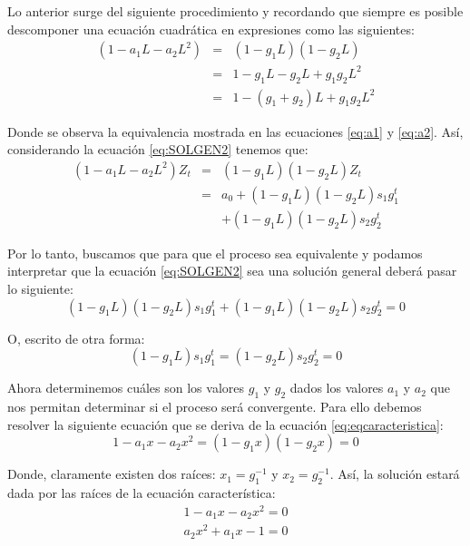 \documentclass[
]{book}
\begin{document}
Lo anterior surge del siguiente procedimiento y recordando que siempre es posible descomponer una ecuación cuadrática en expresiones como las siguientes:
\begin{eqnarray}
    (1 - a_1 L - a_2 L^2) & = & (1 - g_1 L)(1 - g_2 L) \nonumber \\
    & = & 1 - g_1 L - g_2 L + g_1 g_2 L^2 \nonumber \\
    & = & 1 - (g_1 + g_2) L + g_1 g_2 L^2
    \label{eq:eqcaracteristica}
\end{eqnarray}

Donde se observa la equivalencia mostrada en las ecuaciones \eqref{eq:a1} y \eqref{eq:a2}. Así, considerando la ecuación \eqref{eq:SOLGEN2} tenemos que:
\begin{eqnarray}
    (1 - a_1 L - a_2 L^2) Z_t & = & (1 - g_1 L)(1 - g_2 L) Z_t \nonumber \\
    & = & a_0 + (1 - g_1 L)(1 - g_2 L) s_1 g^t_1 \nonumber \\
    &  & + (1 - g_1 L)(1 - g_2 L) s_2 g^t_2
    \label{eq:eqcaracteristica1}
\end{eqnarray}

Por lo tanto, buscamos que para que el proceso sea equivalente y podamos interpretar que la ecuación \eqref{eq:SOLGEN2} sea una solución general deberá pasar lo siguiente:
\begin{equation}
    (1 - g_1 L) (1 - g_2 L) s_1 g^t_1 + (1 - g_1 L) (1 - g_2 L) s_2 g^t_2 = 0
    \label{eq:eqcaracteristica2}
\end{equation}

O, escrito de otra forma:
\begin{equation}
    (1 - g_1 L) s_1 g^t_1 = (1 - g_2 L) s_2 g^t_2 = 0
    \label{eq:eqcaracteristica3}
\end{equation}

Ahora determinemos cuáles son los valores \(g_1\) y \(g_2\) dados los valores \(a_1\) y \(a_2\) que nos permitan determinar si el proceso será convergente. Para ello debemos resolver la siguiente ecuación que se deriva de la ecuación \eqref{eq:eqcaracteristica}:
\begin{equation}
    1 - a_1 x - a_2 x^2 = (1 - g_1 x)(1 - g_2 x) = 0
    \label{eq:eqcaracteristica4}
\end{equation}

Donde, claramente existen dos raíces: \(x_1 = g^{-1}_1\) y \(x_2 = g^{-1}_2\). Así, la solución estará dada por las raíces de la ecuación característica:
\begin{eqnarray}
    1 - a_1 x - a_2 x^2 = 0 \nonumber \\
    a_2 x^2 + a_1 x - 1 = 0
    \label{eq:POL2}
\end{eqnarray}
\end{document}
